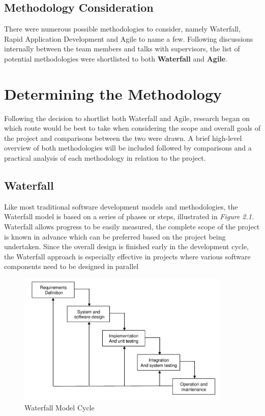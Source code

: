 \subsection{Methodology Consideration}
There were numerous possible methodologies to consider, namely Waterfall, Rapid Application Development and Agile to name a few. Following discussions internally between the team members and talks with supervisors, the list of potential methodologies were shortlisted to both \textbf{Waterfall} and \textbf{Agile}.

\section{Determining the Methodology}
Following the decision to shortlist both Waterfall and Agile, research began on which route would be best to take when considering the scope and overall goals of the project and comparisons between the two were drawn. A brief high-level overview of both methodologies will be included followed by comparisons and a practical analysis of each methodology in relation to the project.

\subsection{Waterfall}
Like most traditional software development models and methodologies, the Waterfall model is based on a series of phases or steps, illustrated in \textit{Figure 2.1}. Waterfall allows progress to be easily measured, the complete scope of the project is known in advance which can be preferred based on the project being undertaken. Since the overall design is finished early in the development cycle, the Waterfall approach is especially effective in projects where various software components need to be designed in parallel \cite{WATERFALL_SURVEY} 

\begin{figure}[H]
	\caption{Waterfall Model Cycle}
	\label{image:myImageName}
	\centering
	\includegraphics[width=0.9\textwidth]{images/waterfall.png}
\end{figure}	

